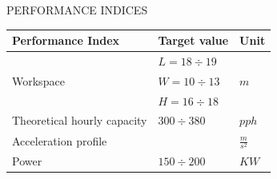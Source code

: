 \documentclass{beamer}              %
\begin{document}
	\begin{frame}{PERFORMANCE INDICES}
		\begin{center}
			\begin{tabular}{lll}
				\toprule
				\textbf{Performance Index}  &\textbf{Target value} &\textbf{Unit} \\
				\toprule					
				& $L=18\div19$ & \\ 
				Workspace&$W=10\div13$ & $m$ \\
				& $H=16\div18$ & \\					
				Theoretical hourly capacity&$300 \div 380$ & $pph$  \\
				Acceleration profile& & $\frac{m}{s^{2}}$ \\				
				
				Power& $150\div200$ & $KW$ \\	
				\bottomrule
			\end{tabular}
		\end{center}	
	\end{frame}
\end{document}

